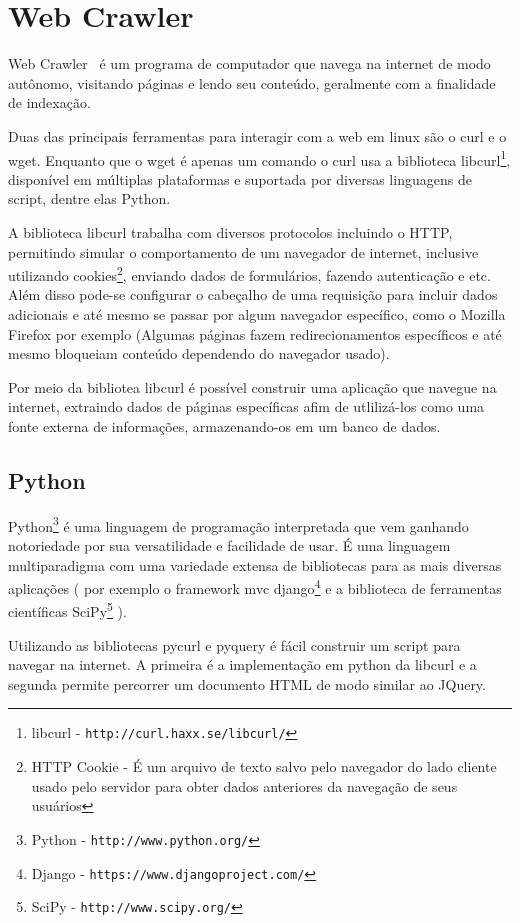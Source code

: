 \section{Web Crawler}
\label{sec:wc}
  Web Crawler~\cite{craw} é um programa de computador que navega na internet de modo autônomo, visitando páginas e lendo seu conteúdo, geralmente com a finalidade de indexação.
  \par
  Duas das principais ferramentas para interagir com a web em linux são o curl e o wget. Enquanto que o wget é apenas um comando o curl usa a biblioteca libcurl\footnote{libcurl - \texttt{http://curl.haxx.se/libcurl/}}, disponível em múltiplas plataformas e suportada por diversas linguagens de script, dentre elas Python.
  \par
  A biblioteca libcurl trabalha com diversos protocolos incluindo o HTTP, permitindo simular o comportamento de um navegador de internet, inclusive utilizando cookies\footnote{HTTP Cookie - É um arquivo de texto salvo pelo navegador do lado cliente usado pelo servidor para obter dados anteriores da navegação de seus usuários}, enviando dados de formulários, fazendo autenticação e etc. Além disso pode-se configurar o cabeçalho de uma requisição para incluir dados adicionais e até mesmo se passar por algum navegador específico, como o Mozilla Firefox por exemplo (Algumas páginas fazem redirecionamentos específicos e até mesmo bloqueiam conteúdo dependendo do navegador usado).
  \par
  Por meio da bibliotea libcurl é possível construir uma aplicação que navegue na internet, extraindo dados de páginas específicas afim de utlilizá-los como uma fonte externa de informações, armazenando-os em um banco de dados.
  
\subsection{Python}

Python\footnote{Python - \texttt{http://www.python.org/}} é uma linguagem de programação interpretada que vem ganhando notoriedade por sua versatilidade e facilidade de usar. É uma linguagem multiparadigma com uma variedade extensa de bibliotecas para as mais diversas aplicações ( por exemplo o framework mvc django\footnote{Django - \texttt{https://www.djangoproject.com/}} e a biblioteca de ferramentas científicas SciPy\footnote{SciPy - \texttt{http://www.scipy.org/}} ).
\par
Utilizando as bibliotecas pycurl e pyquery é fácil construir um script para navegar na internet. A primeira é a implementação em python da libcurl e a segunda permite percorrer um documento HTML de modo similar ao JQuery.


